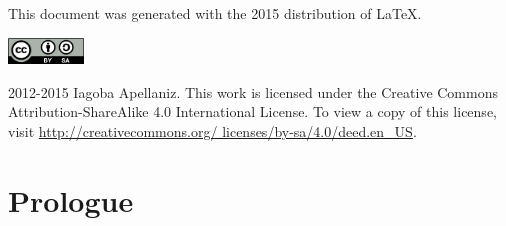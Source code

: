 \documentclass[12pt, letterpaper, twoside]{article}
\numberwithin{equation}{section}
\numberwithin{figure}{section}
\numberwithin{table}{section}
\begin{document}
\renewcommand{\thefootnote}{\fnsymbol{footnote}}

\pagestyle{fancy}
\renewcommand{\headrulewidth}{0pt}
\fancyhead{}
\fancyfoot{}





\cleardoublepage

This document was generated with the 2015 distribution of \LaTeX.

\vfill

\includegraphics[height=20pt]{img/0-CreativeCommons-by-sa.png}

2012-2015 Iagoba Apellaniz. This work is licensed under the Creative Commons
Attribution-ShareAlike 4.0 International License. To view a copy of this
license, visit
\href{http://creativecommons.org/licenses/by-sa/4.0/deed.en_US}
{http://creativecommons.org/ licenses/by-sa/4.0/deed.en\_US}.
\clearpage


\section*{Prologue}
\setcounter{page}{1}
\fancyfoot[LE,RO]{\thepage}


\end{document}
